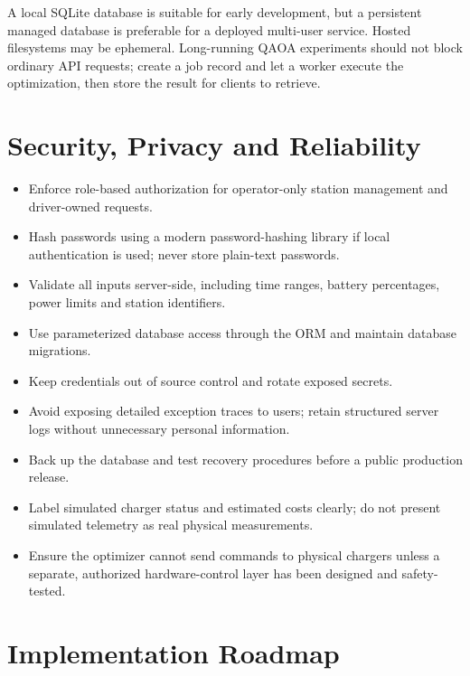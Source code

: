 \documentclass[11pt,a4paper]{article}
\begin{document}
A local SQLite database is suitable for early development, but a persistent managed database is preferable for a deployed multi-user service. Hosted filesystems may be ephemeral. Long-running QAOA experiments should not block ordinary API requests; create a job record and let a worker execute the optimization, then store the result for clients to retrieve.

\section{Security, Privacy and Reliability}

\begin{itemize}
  \item Enforce role-based authorization for operator-only station management and driver-owned requests.
  \item Hash passwords using a modern password-hashing library if local authentication is used; never store plain-text passwords.
  \item Validate all inputs server-side, including time ranges, battery percentages, power limits and station identifiers.
  \item Use parameterized database access through the ORM and maintain database migrations.
  \item Keep credentials out of source control and rotate exposed secrets.
  \item Avoid exposing detailed exception traces to users; retain structured server logs without unnecessary personal information.
  \item Back up the database and test recovery procedures before a public production release.
  \item Label simulated charger status and estimated costs clearly; do not present simulated telemetry as real physical measurements.
  \item Ensure the optimizer cannot send commands to physical chargers unless a separate, authorized hardware-control layer has been designed and safety-tested.
\end{itemize}

\section{Implementation Roadmap}
\end{document}
